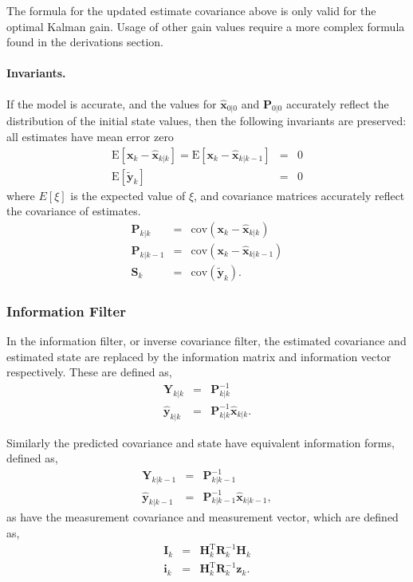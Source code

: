 The formula for the updated estimate covariance above is only valid for the optimal Kalman gain. Usage of other gain values require a more complex formula found in the derivations section.

\paragraph{Invariants.}
If the model is accurate, and the values for $\hat{\textbf{x}}_{0|0}$ and $\textbf{P}_{0|0}$ accurately reflect the distribution of the initial state values, then the following invariants are preserved: all estimates have mean error zero
\begin{eqnarray*}
\textrm{E}[\textbf{x}_k - \hat{\textbf{x}}_{k|k}] = \textrm{E}[\textbf{x}_k - \hat{\textbf{x}}_{k|k-1}] &=& 0 \\
\textrm{E}[\tilde{\textbf{y}}_k] &=& 0
\end{eqnarray*}
where $E[\xi]$ is the expected value of $\xi$, and covariance matrices accurately reflect the covariance of estimates.
\begin{eqnarray*}
\textbf{P}_{k|k} &=& \textrm{cov}(\textbf{x}_k - \hat{\textbf{x}}_{k|k}) \\
\textbf{P}_{k|k-1} &=& \textrm{cov}(\textbf{x}_k - \hat{\textbf{x}}_{k|k-1}) \\
\textbf{S}_{k} &=& \textrm{cov}(\tilde{\textbf{y}}_k).
\end{eqnarray*}


\subsubsection{Information Filter}
In the information filter, or inverse covariance filter, the estimated covariance and estimated state are replaced by the information matrix and information vector respectively. These are defined as,
\begin{eqnarray*}
\textbf{Y}_{k|k} &=& \textbf{P}_{k|k}^{-1} \\
\hat{\textbf{y}}_{k|k} &=& \textbf{P}_{k|k}^{-1}\hat{\textbf{x}}_{k|k}.
\end{eqnarray*}

Similarly the predicted covariance and state have equivalent information forms, defined as,
\begin{eqnarray*}
\textbf{Y}_{k|k-1} &=& \textbf{P}_{k|k-1}^{-1} \\
\hat{\textbf{y}}_{k|k-1} &=& \textbf{P}_{k|k-1}^{-1}\hat{\textbf{x}}_{k|k-1},
\end{eqnarray*}
as have the measurement covariance and measurement vector, which are defined as,
\begin{eqnarray*}
    \textbf{I}_{k} &=& \textbf{H}_{k}^{\text{T}} \textbf{R}_{k}^{-1} \textbf{H}_{k} \\
    \textbf{i}_{k} &=& \textbf{H}_{k}^{\text{T}} \textbf{R}_{k}^{-1} \textbf{z}_{k}.
\end{eqnarray*}

